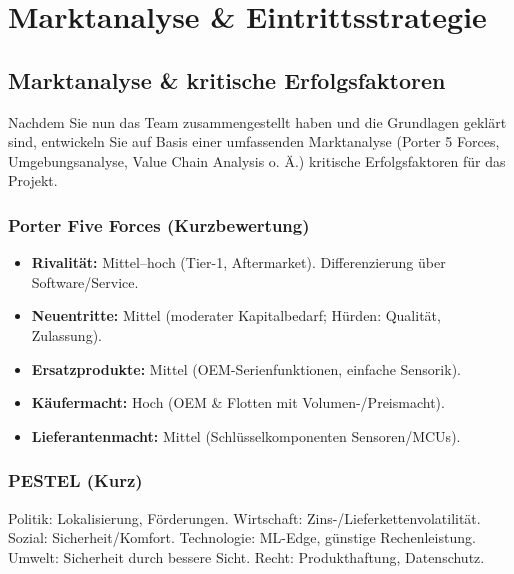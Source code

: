 \documentclass[
%
ngerman %
%
numeric %
]{wbh-assignment}
\begin{document}
\clearpage

\section{Marktanalyse \& Eintrittsstrategie}
\label{sec:2}

\subsection{Marktanalyse \& kritische Erfolgsfaktoren}
\begin{aufgabenstellung}
Nachdem Sie nun das Team zusammengestellt haben und die Grundlagen geklärt sind, entwickeln Sie auf Basis einer umfassenden Marktanalyse (Porter 5 Forces, Umgebungsanalyse, Value Chain Analysis o. Ä.) kritische Erfolgsfaktoren für das Projekt.
\end{aufgabenstellung}

\vspace*{5mm}

\subsubsection{Porter Five Forces (Kurzbewertung)}
\begin{itemize}
  \item \textbf{Rivalität:} Mittel–hoch (Tier-1, Aftermarket). Differenzierung über Software/Service.
  \item \textbf{Neuentritte:} Mittel (moderater Kapitalbedarf; Hürden: Qualität, Zulassung).
  \item \textbf{Ersatzprodukte:} Mittel (OEM-Serienfunktionen, einfache Sensorik).
  \item \textbf{Käufermacht:} Hoch (OEM \& Flotten mit Volumen-/Preismacht).
  \item \textbf{Lieferantenmacht:} Mittel (Schlüsselkomponenten Sensoren/MCUs).
\end{itemize}

\subsubsection{PESTEL (Kurz)}
Politik: Lokalisierung, Förderungen. Wirtschaft: Zins-/Lieferkettenvolatilität. Sozial: Sicherheit/Komfort. Technologie: ML-Edge, günstige Rechenleistung. Umwelt: Sicherheit durch bessere Sicht. Recht: Produkthaftung, Datenschutz.
\end{document}
